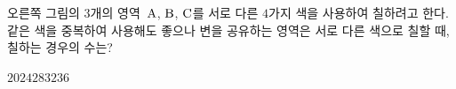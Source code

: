 \hspace*{2mm}\begin{minipage}[t]{\dimexpr\linewidth-2mm\relax}\vspace{0pt}
\noindent\begin{minipage}[t]{0.58\linewidth}\vspace{0pt}\raggedright 오른쪽 그림의 $3$개의 영역~$\mathrm{A}$, $\mathrm{B}$, $\mathrm{C}$를 서로 다른 $4$가지 색을 사용하여 칠하려고 한다. 같은 색을 중복하여 사용해도 좋으나 변을 공유하는 영역은 서로 다른 색으로 칠할 때, 칠하는 경우의 수는? \end{minipage}\hfill\begin{minipage}[t]{0.4\linewidth}\vspace{0pt}\centering \resizebox{\ifdim\width>\linewidth\linewidth\else\width\fi}{!}{}\end{minipage}\par
\begin{choices32}{$20$}{$24$}{$28$}{$32$}{$36$}\end{choices32}\end{minipage}
